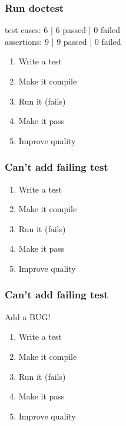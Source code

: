 \begin{frame}[fragile]
\frametitle{Run doctest}
\begin{minipage}[t]{0.48\linewidth}
test cases: 6 | 6 passed | 0 failed\\
assertions: 9 | 9 passed | 0 failed\\
\end{minipage}\hfill
\begin{minipage}[t]{0.28\linewidth}
  \small
  \begin{enumerate} 
    \item \textcolor{deadcolor}{Write a test}
    \item \textcolor{deadcolor}{Make it compile}
    \item \textcolor{deadcolor}{Run it (fails)}
    \item \textcolor{deadcolor}{Make it pass}
    \item \textcolor{activecolor}{Improve quality}
  \end{enumerate} 
\end{minipage}
\end{frame}


\begin{frame}[fragile]
\frametitle{Can't add failing test}
\begin{minipage}[t]{0.48\linewidth}
\end{minipage}\hfill
\begin{minipage}[t]{0.28\linewidth}
  \small
  \begin{enumerate} 
    \item \textcolor{activecolor}{Write a test}
    \item \textcolor{deadcolor}{Make it compile}
    \item \textcolor{deadcolor}{Run it (fails)}
    \item \textcolor{deadcolor}{Make it pass}
    \item \textcolor{deadcolor}{Improve quality}
  \end{enumerate} 
\end{minipage}
\end{frame}

\begin{frame}[fragile]
\frametitle{Can't add failing test}
\begin{minipage}[t]{0.48\linewidth}
    Add a BUG!
\end{minipage}\hfill
\begin{minipage}[t]{0.28\linewidth}
  \small
  \begin{enumerate} 
    \item \textcolor{activecolor}{Write a test}
    \item \textcolor{deadcolor}{Make it compile}
    \item \textcolor{deadcolor}{Run it (fails)}
    \item \textcolor{deadcolor}{Make it pass}
    \item \textcolor{deadcolor}{Improve quality}
  \end{enumerate} 
\end{minipage}
\end{frame}

